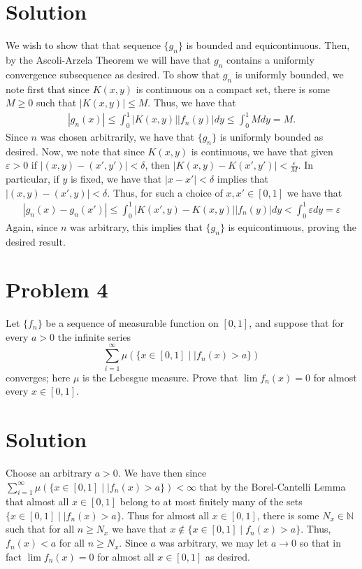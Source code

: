 \documentclass{article}
\begin{document}
\section*{Solution}
We wish to show that that sequence $\{g_n\}$ is bounded and equicontinuous.  Then, by the Ascoli-Arzela Theorem we will have that $g_n$ contains a uniformly convergence subsequence as desired.  To show that $g_n$ is uniformly bounded, we note first that since $K(x,y)$ is continuous on a compact set, there is some $M\geq 0$ such that $|K(x,y)|\leq M$.  Thus, we have that
\begin{align*}
|g_n(x)|\leq\int_0^1|K(x,y)||f_n(y)|dy\leq\int_0^1Mdy=M.
\end{align*}
Since $n$ was chosen arbitrarily, we have that $\{g_n\}$ is uniformly bounded as desired.  Now, we note that since $K(x,y)$ is continuous, we have that given $\varepsilon>0$ if $|(x,y)-(x',y')|<\delta$, then $|K(x,y)-K(x',y')|<\frac{\varepsilon}{M}$.  In particular, if $y$ is fixed, we have that $|x-x'|<\delta$ implies that $|(x,y)-(x',y)|<\delta$.  Thus, for such a choice of $x,x'\in[0,1]$ we have that
\begin{align*}
|g_n(x)-g_n(x')|\leq\int_0^1|K(x',y)-K(x,y)||f_n(y)|dy<\int_0^1\varepsilon dy=\varepsilon
\end{align*}
Again, since $n$ was arbitrary, this implies that $\{g_n\}$ is equicontinuous, proving the desired result.  

\section*{Problem 4}
Let $\{f_n\}$ be a sequence of measurable function on $[0,1]$, and suppose that for every $a>0$ the infinite series $$\sum_{i=1}^\infty\mu(\{x\in[0,1]\mid|f_n(x)>a\})$$ converges; here $\mu$ is the Lebesgue measure.  Prove that $\lim f_n(x)=0$ for almost every $x\in[0,1]$.

\section*{Solution}
Choose an arbitrary $a>0$.  We have then since $\sum_{i=1}^\infty\mu(\{x\in[0,1]\mid|f_n(x)>a\})<\infty$ that by the Borel-Cantelli Lemma that almost all $x\in[0,1]$ belong to at most finitely many of the sets $\{x\in[0,1]\mid|f_n(x)>a\}$.  Thus for almost all $x\in[0,1]$, there is some $N_x\in\mathbb{N}$ such that for all $n\geq N_x$ we have that $x\not\in\{x\in[0,1]\mid f_n(x)>a\}$.  Thus, $f_n(x)<a$ for all $n\geq N_x$.  Since $a$ was arbitrary, we may let $a\rightarrow0$ so that in fact $\lim f_n(x)=0$ for almost all $x\in[0,1]$ as desired.
\end{document}
